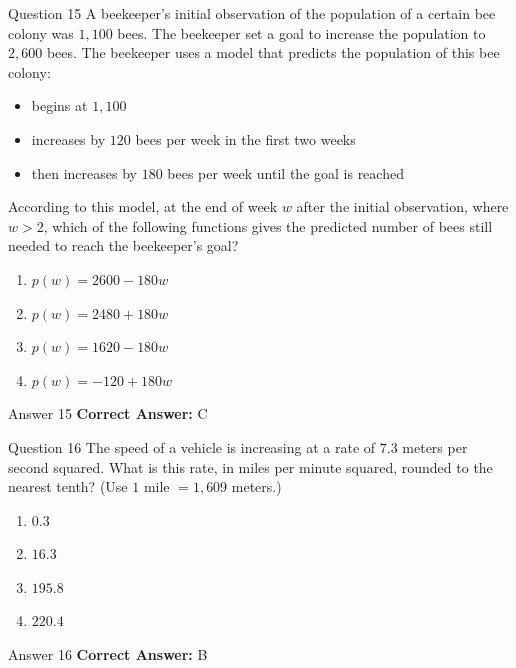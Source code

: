 \documentclass{beamer}
\begin{document}
\begin{frame}{Question 15}
\small
A beekeeper's initial observation of the population of a certain bee colony was \(1{,}100\) bees. The beekeeper set a goal to increase the population to \(2{,}600\) bees.
The beekeeper uses a model that predicts the population of this bee colony:
\begin{itemize}
\item begins at \(1{,}100\)
\item increases by \(120\) bees per week in the first two weeks
\item then increases by \(180\) bees per week until the goal is reached
\end{itemize}
According to this model, at the end of week \(w\) after the initial observation, where \(w > 2\), which of the following functions gives the predicted number of bees still needed to reach the beekeeper's goal?
\vspace{0.35cm}
\begin{enumerate}
    \item[A.] \(p(w) = 2600 - 180w\)
    \item[B.] \(p(w) = 2480 + 180w\)
    \item[C.] \(p(w) = 1620 - 180w\)
    \item[D.] \(p(w) = -120 + 180w\)
\end{enumerate}
\end{frame}
\begin{frame}{Answer 15}
\small
\textbf{Correct Answer:} C
\end{frame}

\begin{frame}{Question 16}
\small
The speed of a vehicle is increasing at a rate of \(7.3\) meters per second squared. What is this rate, in miles per minute squared, rounded to the nearest tenth? (Use \(1\) mile \(= 1{,}609\) meters.)
\vspace{0.35cm}
\begin{enumerate}
    \item[A.] \(0.3\)
    \item[B.] \(16.3\)
    \item[C.] \(195.8\)
    \item[D.] \(220.4\)
\end{enumerate}
\end{frame}
\begin{frame}{Answer 16}
\small
\textbf{Correct Answer:} B
\end{frame}
\end{document}
